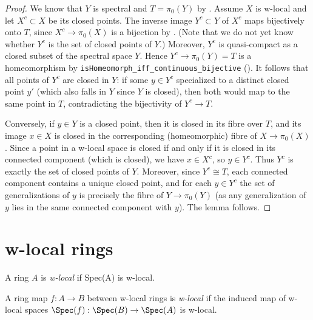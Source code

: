 \begin{proof}
  We know that $Y$ is spectral and $T = \pi_0(Y)$ by . Assume $X$ is w-local and let $X^c \subset X$ be its closed points. The inverse image $Y^c \subset Y$ of $X^c$ maps bijectively onto $T$, since $X^c \to \pi_0(X)$ is a bijection by . (Note that we do not yet know whether $Y^c$ is the set of closed points of $Y$.) Moreover, $Y^c$ is quasi-compact as a closed subset of the spectral space $Y$. Hence $Y^c \to \pi_0(Y) = T$ is a homeomorphism by \verb`isHomeomorph_iff_continuous_bijective` (). It follows that all points of $Y^c$ are closed in $Y$: if some $y \in Y^c$ specialized to a distinct closed point $y'$ (which also falls in $Y$ since $Y$ is closed), then both would map to the same point in $T$, contradicting the bijectivity of $Y^c \to T$.

  Conversely, if $y \in Y$ is a closed point, then it is closed in its fibre over $T$, and its image $x \in X$ is closed in the corresponding (homeomorphic) fibre of $X \to \pi_0(X)$. Since a point in a w-local space is closed if and only if it is closed in its connected component (which is closed), we have $x \in X^c$, so $y \in Y^c$. Thus $Y^c$ is exactly the set of closed points of $Y$. Moreover, since $Y^c \cong T$, each connected component contains a unique closed point, and for each $y \in Y^c$ the set of generalizations of $y$ is precisely the fibre of $Y \to \pi_0(Y)$ (as any generalization of $y$ lies in the same connected component with $y$). The lemma follows.
\end{proof}

\section{w-local rings}

\begin{definition}
    A ring \(A\) is \emph{w-local} if Spec(A) is w-local.
    \label{def:w-local-ring}
    \leanok
\end{definition}

\begin{definition}
    A ring map \(f: A \to B\) between w-local rings is \emph{w-local} if the induced map of w-local spaces \(\Spec(f) : \Spec(B) \to \Spec(A)\) is w-local.
    \label{def:w-local-ring-map}
\end{definition}

